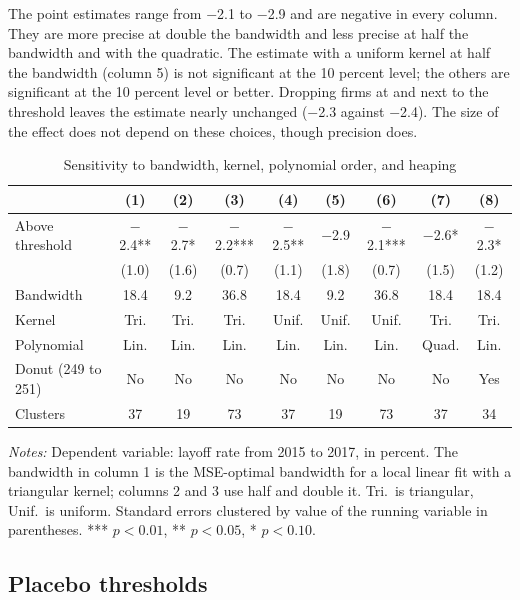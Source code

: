 \documentclass[12pt]{article}
\begin{document}
The point estimates range from $-$2.1 to $-$2.9 and are negative in every column. They are more precise at double the bandwidth and less precise at half the bandwidth and with the quadratic. The estimate with a uniform kernel at half the bandwidth (column 5) is not significant at the 10 percent level; the others are significant at the 10 percent level or better. Dropping firms at and next to the threshold leaves the estimate nearly unchanged ($-$2.3 against $-$2.4). The size of the effect does not depend on these choices, though precision does.

\begin{table}[htbp]
\centering
\small
\begin{threeparttable}
\caption{Sensitivity to bandwidth, kernel, polynomial order, and heaping}
\begin{tabular}{lcccccccc}
\toprule
 & (1) & (2) & (3) & (4) & (5) & (6) & (7) & (8) \\
\midrule
Above threshold & $-$2.4** & $-$2.7* & $-$2.2*** & $-$2.5** & $-$2.9 & $-$2.1*** & $-$2.6* & $-$2.3* \\
 & (1.0) & (1.6) & (0.7) & (1.1) & (1.8) & (0.7) & (1.5) & (1.2) \\
\midrule
Bandwidth & 18.4 & 9.2 & 36.8 & 18.4 & 9.2 & 36.8 & 18.4 & 18.4 \\
Kernel & Tri. & Tri. & Tri. & Unif. & Unif. & Unif. & Tri. & Tri. \\
Polynomial & Lin. & Lin. & Lin. & Lin. & Lin. & Lin. & Quad. & Lin. \\
Donut (249 to 251) & No & No & No & No & No & No & No & Yes \\
Clusters & 37 & 19 & 73 & 37 & 19 & 73 & 37 & 34 \\
\bottomrule
\end{tabular}
\begin{tablenotes}\footnotesize
\item \emph{Notes:} Dependent variable: layoff rate from 2015 to 2017, in percent. The bandwidth in column 1 is the MSE-optimal bandwidth for a local linear fit with a triangular kernel; columns 2 and 3 use half and double it. Tri.\ is triangular, Unif.\ is uniform. Standard errors clustered by value of the running variable in parentheses. *** $p<0.01$, ** $p<0.05$, * $p<0.10$.
\end{tablenotes}
\end{threeparttable}
\end{table}

\subsection{Placebo thresholds}
\end{document}
